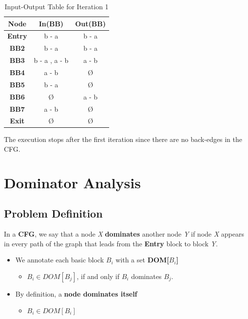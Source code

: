 \documentclass[a4paper,12pt,numbers=noenddot]{scrreprt}
\begin{document}
        \vspace{1cm}

        \begin{table}[H]
            \centering
            \begin{tabular}{|c|c|c|}
                \hline
                \textbf{Node} & \textbf{In(BB)} & \textbf{Out(BB)} \\
                \hline
                \textbf{Entry} & b - a & b - a \\
                \textbf{BB2}   & b - a & b - a \\
                \textbf{BB3}   & b - a , a - b  & a - b \\
                \textbf{BB4}   & a - b & Ø \\
                \textbf{BB5}   & b - a & Ø \\
                \textbf{BB6}   & Ø & a - b\\
                \textbf{BB7}   & a - b & Ø \\
                \textbf{Exit}  & Ø & Ø \\
                \hline
            \end{tabular}
            \caption{Input-Output Table for Iteration 1}
            \label{tab:vbe_input_output_table}
        \end{table}

        The execution stops after the first iteration since there are no back-edges in the CFG.

\chapter*{Dominator Analysis}

    \section*{Problem Definition}

        In a \textbf{CFG}, we say that a node \textit{X} \textbf{dominates} another node \textit{Y} if node \textit{X} appears in every path of the graph that leads from the \textbf{Entry} block to block \textit{Y}.
        \begin{itemize}
            \item We annotate each basic block $B_i$ with a set \textbf{DOM[$B_i$]}
            \begin{itemize}
                \item $B_i \in DOM[B_j]$, if and only if $B_i$ dominates $B_j$.
            \end{itemize}
            \item By definition, a \textbf{node dominates itself}
                \begin{itemize}
                    \item $B_i \in DOM[B_i]$
                \end{itemize}
        \end{itemize}
\end{document}
